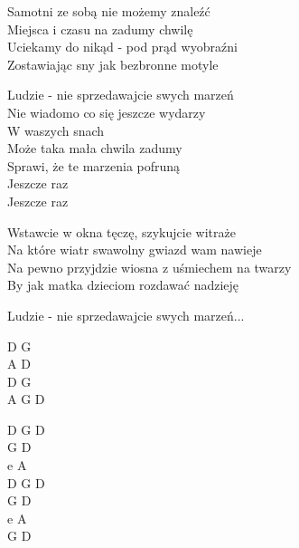 \begin{text}
    Samotni ze sobą nie możemy znaleźć\\
    Miejsca i czasu na zadumy chwilę\\
    Uciekamy do nikąd - pod prąd wyobraźni\\
    Zostawiając sny jak bezbronne motyle

    \vin Ludzie - nie sprzedawajcie swych marzeń \\
    \vin Nie wiadomo co się jeszcze wydarzy\\
    \vin W waszych snach\\
    \vin Może taka mała chwila zadumy\\
    \vin Sprawi, że te marzenia pofruną\\
    \vin Jeszcze raz\\
    \vin Jeszcze raz

    Wstawcie w okna tęczę, szykujcie witraże\\
    Na które wiatr swawolny gwiazd wam nawieje\\
    Na pewno przyjdzie wiosna z uśmiechem na twarzy\\
    By jak matka dzieciom rozdawać nadzieję

    \vin Ludzie - nie sprzedawajcie swych marzeń...
\end{text}
\begin{chord}
    D G\\
    A D\\
    D G\\
    A G D

    D G D\\
    G D\\
    e A\\
    D G D\\
    G D\\
    e A\\
    G D
\end{chord}